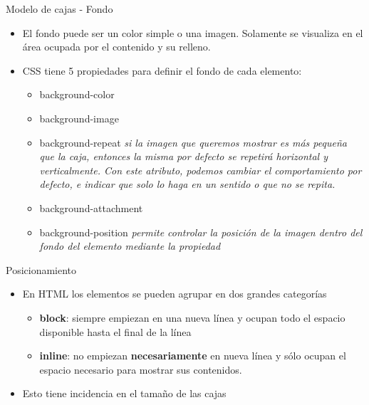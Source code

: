 \documentclass[aspectratio=43,10pt,t]{beamer}
\begin{document}
\begin{frame}{Modelo de cajas - Fondo}\relax
\begingroup
{}
\begin{itemize}
  \item\relax El fondo puede ser un color simple o una imagen. Solamente se visualiza en el área ocupada por el contenido y su relleno.
  \item\relax CSS tiene 5 propiedades para definir el fondo de cada elemento:
  \begin{itemize}
    \item\relax background-color
    \item\relax background-image
    \item\relax background-repeat\flechag{} \textit{{\fontsize{9.1}{11.9}\selectfont si la imagen que queremos mostrar es más pequeña que la caja, entonces la misma por defecto se repetirá horizontal y verticalmente. Con este atributo, podemos cambiar el comportamiento por defecto, e indicar que solo lo haga en un sentido o que no se repita.}}
    \item\relax background-attachment
    \item\relax background-position \flechag{} \textit{{\fontsize{9.1}{11.9}\selectfont permite controlar la posición de la imagen dentro del fondo del elemento mediante la propiedad}}
  \end{itemize}
\end{itemize}
\endgroup
\end{frame}

\begin{frame}{Posicionamiento}\relax
\begingroup
{}
\begin{itemize}
  \item\relax En HTML los elementos se pueden agrupar en dos grandes categorías
  \begin{itemize}
    \item\relax \textbf{block}: siempre empiezan en una nueva línea y ocupan todo el espacio disponible hasta el final de la línea
    \item\relax \textbf{inline}: no empiezan \textbf{necesariamente} en nueva línea y sólo ocupan el espacio necesario para mostrar sus contenidos.
  \end{itemize}
  \item\relax Esto tiene incidencia en el tamaño de las cajas
\end{itemize}
\endgroup
{}
\end{frame}
\end{document}
